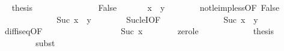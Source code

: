 \begin{isabellebody}
\ \isamarkupfalse%
\ {\isacharquery}{\kern0pt}thesis\isanewline
\ \ \ \ \ \ \isacommand{{\isachardot}{\kern0pt}}\isamarkupfalse%
\isanewline
\ \ \isamarkupfalse%
\isanewline
\ \ \ \ \isamarkupfalse%
\ False\isanewline
\ \ \ \ \isamarkupfalse%
\ {}{\isacharcolon}{\kern0pt}\ {\isachardoublequoteopen}x\ {\isacharless}{\kern0pt}\ y{\isachardoublequoteclose}\isanewline
\ \ \ \ \ \ \isamarkupfalse%
\ not{\isacharunderscore}{\kern0pt}le{\isacharunderscore}{\kern0pt}imp{\isacharunderscore}{\kern0pt}less{\isacharbrackleft}{\kern0pt}OF\ False{\isacharbrackright}{\kern0pt}\isanewline
\ \ \ \ \ \ \isacommand{{\isachardot}{\kern0pt}}\isamarkupfalse%
\isanewline
\ \ \ \ \isamarkupfalse%
\ {}{\isacharcolon}{\kern0pt}\ {\isachardoublequoteopen}Suc\ x\ {\isasymle}\ y{\isachardoublequoteclose}\isanewline
\ \ \ \ \ \ \isamarkupfalse%
\ Suc{\isacharunderscore}{\kern0pt}leI{\isacharbrackleft}{\kern0pt}OF\ {}{\isacharbrackright}{\kern0pt}\isanewline
\ \ \ \ \ \ \isacommand{{\isachardot}{\kern0pt}}\isamarkupfalse%
\isanewline
\ \ \ \ \isamarkupfalse%
\ {}{\isacharcolon}{\kern0pt}\ {\isachardoublequoteopen}Suc\ x\ {\isacharminus}{\kern0pt}\ y\ {\isacharequal}{\kern0pt}\ {}{\isachardoublequoteclose}\isanewline
\ \ \ \ \ \ \isamarkupfalse%
\ diff{\isacharunderscore}{\kern0pt}is{\isacharunderscore}{\kern0pt}{}{\isacharunderscore}{\kern0pt}eq{\isacharprime}{\kern0pt}{\isacharbrackleft}{\kern0pt}OF\ {}{\isacharbrackright}{\kern0pt}\isanewline
\ \ \ \ \ \ \isacommand{{\isachardot}{\kern0pt}}\isamarkupfalse%
\ \isanewline
\ \ \ \ \isamarkupfalse%
\ {}{\isacharcolon}{\kern0pt}\ {\isachardoublequoteopen}{}\ {\isasymle}\ Suc\ x{\isachardoublequoteclose}\isanewline
\ \ \ \ \ \ \isamarkupfalse%
\ zero{\isacharunderscore}{\kern0pt}le\isanewline
\ \ \ \ \ \ \isacommand{{\isachardot}{\kern0pt}}\isamarkupfalse%
\isanewline
\ \ \ \ \isamarkupfalse%
\ {\isacharquery}{\kern0pt}thesis\isanewline
\ \ \ \ \ \ \isamarkupfalse%
\ {}\isanewline
\ \ \ \ \ \ \isamarkupfalse%
{\isacharparenleft}{\kern0pt}subst\ {}{\isacharparenright}{\kern0pt}\isanewline
\ \ \ \ \ \ \isacommand{{\isachardot}{\kern0pt}}\isamarkupfalse%
\isanewline
\ \ \isamarkupfalse%
\isanewline
{}\isamarkupfalse%
%
\endisatagproof
{\isafoldproof}%
%
\isadelimproof
\isanewline
%
\endisadelimproof
\isanewline
%
\isadelimtheory
\isanewline
%
\endisadelimtheory
%
\isatagtheory
{}\isamarkupfalse%
%
\endisatagtheory
{\isafoldtheory}%
%
\isadelimtheory
%
\endisadelimtheory
%
\end{isabellebody}%
